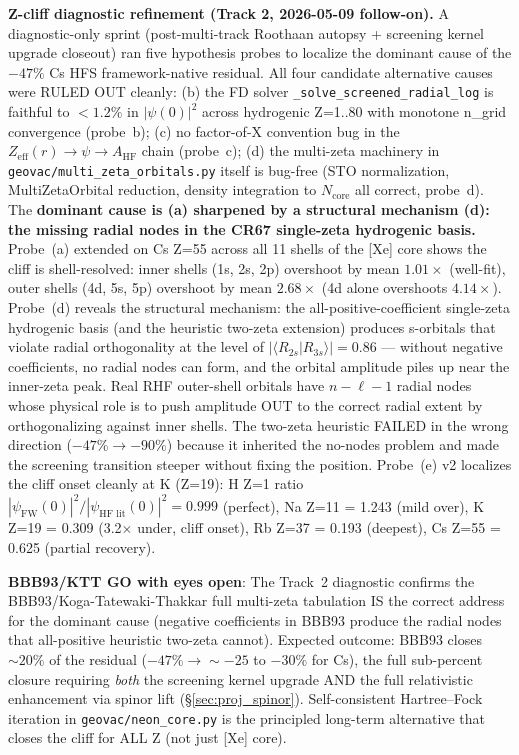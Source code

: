 \documentclass[11pt]{article}
\begin{document}
\textbf{Z-cliff diagnostic refinement (Track 2, 2026-05-09 follow-on).}
A diagnostic-only sprint (post-multi-track Roothaan autopsy + screening
kernel upgrade closeout) ran five hypothesis probes to localize the
dominant cause of the $-47\%$ Cs HFS framework-native residual.  All
four candidate alternative causes were RULED OUT cleanly: (b) the FD
solver \texttt{\_solve\_screened\_radial\_log} is faithful to $<1.2\%$
in $|\psi(0)|^2$ across hydrogenic Z=1..80 with monotone n\_grid
convergence (probe~b); (c) no factor-of-X convention bug in the
$Z_\text{eff}(r) \to \psi \to A_\text{HF}$ chain (probe~c); (d) the
multi-zeta machinery in \texttt{geovac/multi\_zeta\_orbitals.py}
itself is bug-free (STO normalization, MultiZetaOrbital reduction,
density integration to $N_\text{core}$ all correct, probe~d).  The
\textbf{dominant cause is (a) sharpened by a structural mechanism (d):
the missing radial nodes in the CR67 single-zeta hydrogenic basis.}
Probe~(a) extended on Cs Z=55 across all 11 shells of the [Xe] core
shows the cliff is shell-resolved: inner shells (1s, 2s, 2p) overshoot
by mean $1.01\times$ (well-fit), outer shells (4d, 5s, 5p) overshoot
by mean $2.68\times$ (4d alone overshoots $4.14\times$).  Probe~(d)
reveals the structural mechanism: the all-positive-coefficient
single-zeta hydrogenic basis (and the heuristic two-zeta extension)
produces s-orbitals that violate radial orthogonality at the level of
$|\langle R_{2s}|R_{3s}\rangle| = 0.86$ --- without negative
coefficients, no radial nodes can form, and the orbital amplitude
piles up near the inner-zeta peak.  Real RHF outer-shell orbitals
have $n - \ell - 1$ radial nodes whose physical role is to push
amplitude OUT to the correct radial extent by orthogonalizing against
inner shells.  The two-zeta heuristic FAILED in the wrong direction
($-47\% \to -90\%$) because it inherited the no-nodes problem and
made the screening transition steeper without fixing the position.
Probe~(e) v2 localizes the cliff onset cleanly at K (Z=19): H Z=1
ratio $|\psi_\text{FW}(0)|^2 / |\psi_\text{HF lit}(0)|^2 = 0.999$
(perfect), Na Z=11 = 1.243 (mild over), K Z=19 = 0.309 (3.2$\times$
under, cliff onset), Rb Z=37 = 0.193 (deepest), Cs Z=55 = 0.625
(partial recovery).

\textbf{BBB93/KTT GO with eyes open}: The Track~2 diagnostic confirms
the BBB93/Koga-Tatewaki-Thakkar full multi-zeta tabulation IS the
correct address for the dominant cause (negative coefficients in
BBB93 produce the radial nodes that all-positive heuristic two-zeta
cannot).  Expected outcome: BBB93 closes $\sim 20\%$ of the residual
($-47\% \to \sim -25$ to $-30\%$ for Cs), the full sub-percent closure
requiring \emph{both} the screening kernel upgrade AND the full
relativistic enhancement via spinor lift
(\S\ref{sec:proj_spinor}).  Self-consistent Hartree--Fock iteration
in \texttt{geovac/neon\_core.py} is the principled long-term
alternative that closes the cliff for ALL Z (not just [Xe] core).
\end{document}
